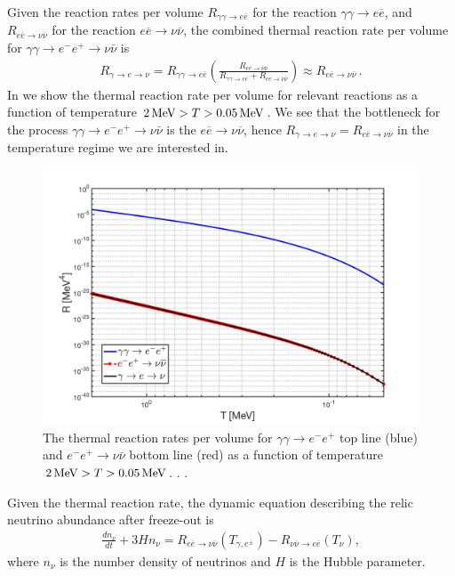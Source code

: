  Given the reaction rates per volume $R_{\gamma\gamma\to e\overline{e}}$ for the reaction $\gamma\gamma\to e\overline{e}$, and $R_{e\overline{e}\to\nu\overline{\nu}}$ for the reaction $e\overline{e}\to\nu\overline{\nu}$, the combined thermal reaction rate per volume for $\gamma\gamma\to e^-e^+\to\nu\bar{\nu}$ is
\begin{align}
R_{\gamma\to e\to\nu}=R_{\gamma\gamma\to e\overline{e}}\left(\frac{R_{e\overline{e}\to\nu\overline{\nu}}}{R_{\gamma\gamma\to e\overline{e}}+R_{e\overline{e}\to\nu\overline{\nu}}}\right)\approx R_{e\overline{e}\to\nu\overline{\nu}}\,.
\end{align}
In  we show the thermal reaction rate per volume for relevant reactions as a function of temperature $2\text{\,MeV}>T>0.05\text{\,MeV}$. We see that the bottleneck for the process $\gamma\gamma\to e^-e^+\to\nu\bar{\nu}$ is the $e\overline{e}\to\nu\overline{\nu}$, hence $R_{\gamma\to e\to\nu}=R_{e\overline{e}\to\nu\overline{\nu}}$ in the temperature regime we are interested in.
\begin{figure}
\begin{center}
\includegraphics[width=0.8\linewidth]{./plots/Extra_neutrino_rate_volume}
\caption{The thermal reaction rates per volume for $\gamma\gamma\to e^-e^+$ top line (blue) and $e^-e^+\to\nu\bar{\nu}$ bottom line (red) as a function of temperature $2\text{\,MeV}>T>0.05\text{\,MeV}$. . .}
\label{ExtraNeutrinoRate}
\end{center}
\end{figure}

Given the thermal reaction rate, the dynamic equation describing the relic neutrino abundance after freeze-out is
\begin{align}\label{ExtraNeutrioEq}
\frac{dn_\nu}{dt}+3Hn_\nu=R_{e\overline{e}\to\nu\overline{\nu}}(T_{\gamma,e^\pm})-R_{\nu\overline{\nu}\to e\overline{e}}(T_\nu),
\end{align}
where $n_\nu$ is the number density of neutrinos and $H$ is the Hubble parameter. 

